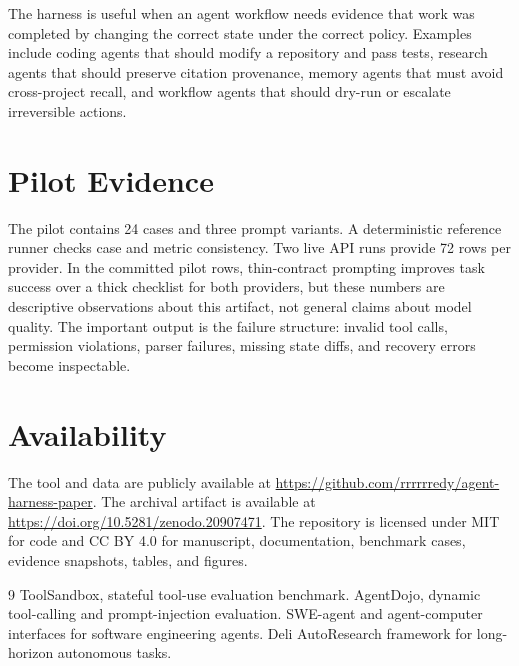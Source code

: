 \documentclass[10pt,conference]{IEEEtran}
\begin{document}
The harness is useful when an agent workflow needs evidence that work was
completed by changing the correct state under the correct policy. Examples
include coding agents that should modify a repository and pass tests, research
agents that should preserve citation provenance, memory agents that must avoid
cross-project recall, and workflow agents that should dry-run or escalate
irreversible actions.

\section{Pilot Evidence}

The pilot contains 24 cases and three prompt variants. A deterministic reference
runner checks case and metric consistency. Two live API runs provide 72 rows per
provider. In the committed pilot rows, thin-contract prompting improves task
success over a thick checklist for both providers, but these numbers are
descriptive observations about this artifact, not general claims about model
quality. The important output is the failure structure: invalid tool calls,
permission violations, parser failures, missing state diffs, and recovery
errors become inspectable.

\section{Availability}

The tool and data are publicly available at
\url{https://github.com/rrrrrredy/agent-harness-paper}. The archival artifact is
available at \url{https://doi.org/10.5281/zenodo.20907471}. The repository is
licensed under MIT for code and CC BY 4.0 for manuscript, documentation,
benchmark cases, evidence snapshots, tables, and figures.

\begin{thebibliography}{9}
 ToolSandbox, stateful tool-use evaluation benchmark.
 AgentDojo, dynamic tool-calling and prompt-injection evaluation.
 SWE-agent and agent-computer interfaces for software engineering agents.
 Deli AutoResearch framework for long-horizon autonomous tasks.
\end{thebibliography}
\end{document}
